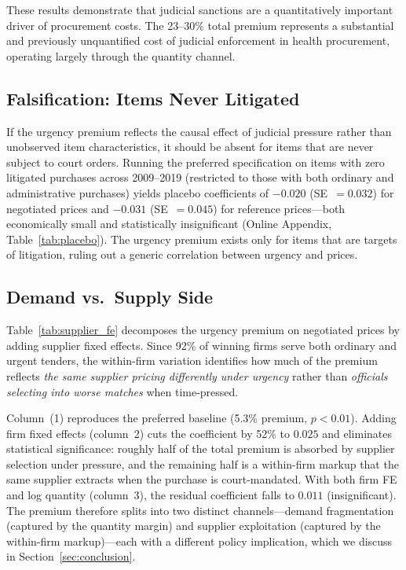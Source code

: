 These results demonstrate that judicial sanctions are a quantitatively important driver of procurement costs. The 23--30\% total premium represents a substantial and previously unquantified cost of judicial enforcement in health procurement, operating largely through the quantity channel.

\subsection{Falsification: Items Never Litigated}
\label{sec:placebo}

If the urgency premium reflects the causal effect of judicial pressure
rather than unobserved item characteristics, it should be absent for
items that are never subject to court orders. Running the preferred
specification on items with zero litigated purchases across 2009--2019
(restricted to those with both ordinary and administrative purchases)
yields placebo coefficients of $-0.020$ (SE~$= 0.032$) for negotiated
prices and $-0.031$ (SE~$= 0.045$) for reference prices---both
economically small and statistically insignificant (Online Appendix,
Table~\ref{tab:placebo}). The urgency premium exists only for items
that are targets of litigation, ruling out a generic correlation
between urgency and prices.

\subsection{Demand vs.\ Supply Side}
\label{sec:supplier_fe}

Table~\ref{tab:supplier_fe} decomposes the urgency premium on negotiated
prices by adding supplier fixed effects. Since 92\% of winning firms
serve both ordinary and urgent tenders, the within-firm variation
identifies how much of the premium reflects \emph{the same supplier
pricing differently under urgency} rather than \emph{officials selecting
into worse matches} when time-pressed.



Column~(1) reproduces the preferred baseline (5.3\% premium, $p < 0.01$).
Adding firm fixed effects (column~2) cuts the coefficient by 52\% to
$0.025$ and eliminates statistical significance: roughly half of the total
premium is absorbed by supplier selection under pressure, and the
remaining half is a within-firm markup that the same supplier extracts
when the purchase is court-mandated. With both firm FE and log quantity
(column~3), the residual coefficient falls to $0.011$ (insignificant).
The premium therefore splits into two distinct channels---demand
fragmentation (captured by the quantity margin) and supplier exploitation
(captured by the within-firm markup)---each with a different policy
implication, which we discuss in Section~\ref{sec:conclusion}.


